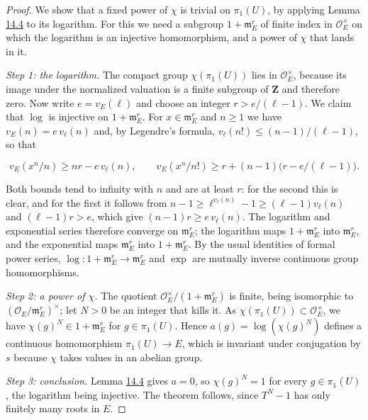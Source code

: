 \documentclass[11pt]{article}
\begin{document}
\begin{proof}[{Proof}]\label{bp21}%
We show that a fixed power of \(\chi\) is trivial on \(\pi_1(U)\), by applying Lemma \hyperref[bp17]{14.4} to its logarithm. For this we need a subgroup \(1+\mathfrak m_E^r\) of finite index in \(\mathcal O_E^\times\) on which the logarithm is an injective homomorphism, and a power of \(\chi\) that lands in it.

\emph{Step 1: the logarithm.} The compact group \(\chi(\pi_1(U))\) lies in \(\mathcal O_E^\times\), because its image under the normalized valuation is a finite subgroup of \(\mathbf Z\) and therefore zero. Now write \(e=v_E(\ell)\) and choose an integer \(r>e/(\ell-1)\). We claim that \(\log\) is injective on \(1+\mathfrak m_E^r\). For \(x\in\mathfrak m_E^r\) and \(n\ge1\) we have \(v_E(n)=e\,v_\ell(n)\) and, by Legendre's formula, \(v_\ell(n!)\le(n-1)/(\ell-1)\), so that

\[
v_E(x^n/n)\ge nr-e\,v_\ell(n),
\qquad
v_E(x^n/n!)\ge r+(n-1)\bigl(r-e/(\ell-1)\bigr).
\]

Both bounds tend to infinity with \(n\) and are at least \(r\): for the second this is clear, and for the first it follows from \(n-1\ge\ell^{v_\ell(n)}-1\ge(\ell-1)v_\ell(n)\) and \((\ell-1)r>e\), which give \((n-1)r\ge e\,v_\ell(n)\). The logarithm and exponential series therefore converge on \(\mathfrak m_E^r\); the logarithm maps \(1+\mathfrak m_E^r\) into \(\mathfrak m_E^r\), and the exponential maps \(\mathfrak m_E^r\) into \(1+\mathfrak m_E^r\). By the usual identities of formal power series, \(\log:1+\mathfrak m_E^r\to\mathfrak m_E^r\) and \(\exp\) are mutually inverse continuous group homomorphisms.

\emph{Step 2: a power of \(\chi\).} The quotient \(\mathcal O_E^\times/(1+\mathfrak m_E^r)\) is finite, being isomorphic to \((\mathcal O_E/\mathfrak m_E^r)^\times\); let \(N>0\) be an integer that kills it. As \(\chi(\pi_1(U))\subset\mathcal O_E^\times\), we have \(\chi(g)^N\in1+\mathfrak m_E^r\) for \(g\in\pi_1(U)\). Hence \(a(g)=\log(\chi(g)^N)\) defines a continuous homomorphism \(\pi_1(U)\to E\), which is invariant under conjugation by \(s\) because \(\chi\) takes values in an abelian group.

\emph{Step 3: conclusion.} Lemma \hyperref[bp17]{14.4} gives \(a=0\), so \(\chi(g)^N=1\) for every \(g\in\pi_1(U)\), the logarithm being injective. The theorem follows, since \(T^N-1\) has only finitely many roots in \(E\).
\end{proof}
\end{document}
